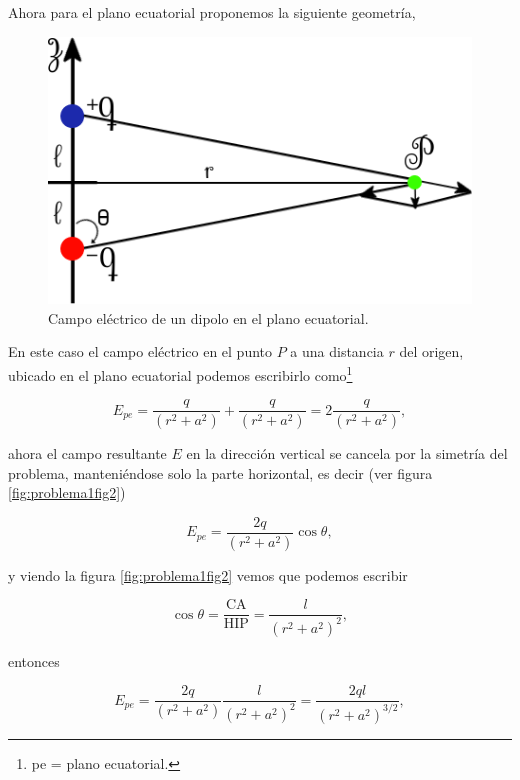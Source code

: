 \documentclass[a4paper,11pt]{article}
\numberwithin{equation}{section}
\begin{document}
\vspace{.2cm}

Ahora para el plano ecuatorial proponemos la siguiente geometría, 

\begin{figure}[H]
 \center 
 \includegraphics[scale=0.5]{problema1fig2}
 \caption{Campo eléctrico de un dipolo en el plano ecuatorial.}
 \label{fig:problema1fig2}
\end{figure}

En este caso el campo eléctrico en el punto $P$ a una distancia $r$ del origen, 
ubicado en el plano ecuatorial podemos escribirlo como\footnote{pe = plano ecuatorial.}

\begin{equation}
 E_{pe} = \frac{q}{(r^2+a^2)} + \frac{q}{(r^2+a^2)} = 2 \frac{q}{(r^2+a^2)},
\end{equation}

ahora el campo resultante $E$ en la dirección vertical se cancela por la simetría 
del problema, manteniéndose solo la parte horizontal, es decir (ver figura
\eqref{fig:problema1fig2})

\begin{equation}
 E_{pe} = \frac{2q}{(r^2+a^2)}\cos{\theta},
\end{equation}

y viendo la figura \eqref{fig:problema1fig2} vemos que podemos escribir 

\begin{equation}
 \cos{\theta} = \frac{\text{CA}}{\text{HIP}} = \frac{l}{(r^2+a^2)^2},
\end{equation}

entonces 

\begin{equation}
 E_{pe} = \frac{2q}{(r^2+a^2)} \frac{l}{(r^2+a^2)^2} = \frac{2ql}{(r^2+a^2)^{3/2}},
\end{equation}
\end{document}

